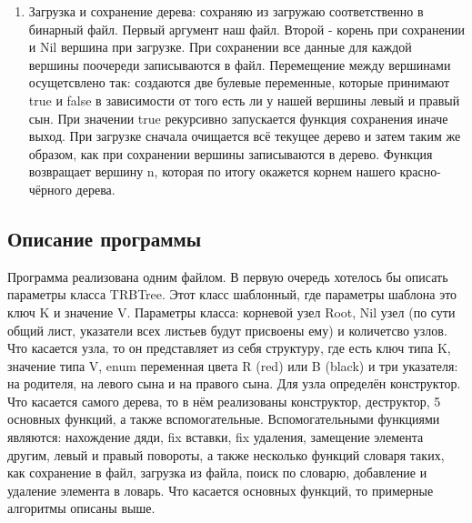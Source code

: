 \documentclass[12pt]{article}
\begin{document}
\begin{enumerate}
\item Загрузка и сохранение дерева: сохраняю из загружаю соответственно в бинарный файл. Первый аргумент наш файл. Второй - корень при сохранении и Nil вершина при загрузке. При сохранении все данные для каждой вершины поочереди записываются в файл. Перемещение между вершинами осущетсвлено так: создаются две булевые переменные, которые принимают true и false в зависимости от того есть ли у нашей вершины левый и правый сын. При значении true рекурсивно запускается функция сохранения иначе выход. При загрузке сначала очищается всё текущее дерево и затем таким же образом, как при сохранении вершины записываются в дерево. Функция возвращает вершину n, которая по итогу окажется корнем нашего красно-чёрного дерева.
\end{enumerate}

\subsection*{Описание программы}

Программа реализована одним файлом. В первую очередь хотелось бы описать параметры класса TRBTree. Этот класс шаблонный, где параметры шаблона это ключ K и значение V. Параметры класса: корневой узел Root, Nil узел (по сути общий лист, указатели всех листьев будут присвоены ему) и количетсво узлов. Что касается узла, то он представляет из себя структуру, где есть ключ типа K, значение типа V, enum переменная цвета R (red) или B (black) и три указателя: на родителя, на левого сына и на правого сына. Для узла определён конструктор. Что касается самого дерева, то в нём реализованы конструктор, деструктор, 5 основных функций, а также вспомогательные. Вспомогательными функциями являются: нахождение дяди, fix вставки, fix удаления, замещение элемента другим, левый и правый повороты, а также несколько функций словаря таких, как сохранение в файл, загрузка из файла, поиск по словарю, добавление и удаление элемента в ловарь. Что касается основных функций, то примерные алгоритмы описаны выше.
\end{document}
